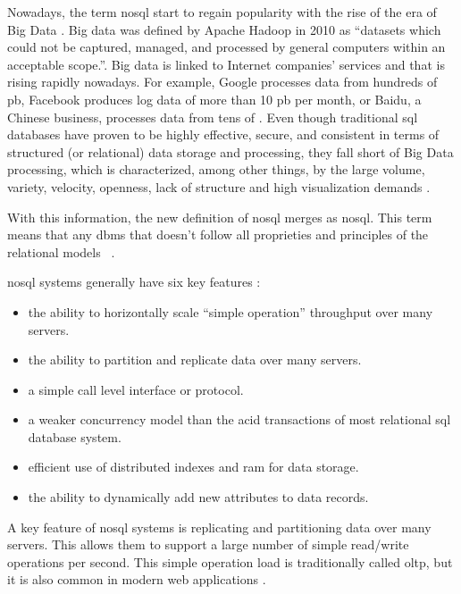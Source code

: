 Nowadays, the term \gls{nosql} start to regain popularity with the rise of the era of Big Data \cite{nosqlchoose}. Big data was defined by Apache Hadoop in 2010 as “datasets which could not be captured, managed, and processed by general computers within an acceptable scope.”. Big data is linked to Internet companies' services and that is rising rapidly nowadays. For example, Google processes data from hundreds of \gls{pb}, Facebook produces log data of more than 10 \gls{pb} per month, or Baidu, a Chinese business, processes data from tens of  \cite{chen2014big}. Even though traditional \gls{sql} databases have proven to be highly effective, secure, and consistent in terms of structured (or relational) data storage and processing, they fall short of Big Data processing, which is characterized, among other things, by the large volume, variety, velocity, openness, lack of structure and high visualization demands \cite{nosqlchoose,https://doi.org/10.1002/cpe.3398}.

With this information, the new definition of \gls{nosql} merges as \acrlong{nosql}. This term means that any \gls{dbms} that doesn't follow all proprieties and principles of the relational models ~\cite{wuoverview,nosqlchoose,breiefreview}. ~

\gls{nosql} systems generally have six key features \cite{cattell2011scalable}:
\begin{itemize}
    \item the ability to horizontally scale “simple operation” throughput over many servers. 
    \item the ability to partition and replicate data over many servers.
    \item a simple call level interface or protocol.
    \item a weaker concurrency model than the \gls{acid} transactions of most relational \gls{sql} database system.
    \item efficient use of distributed indexes and \gls{ram} for
data storage.
    \item the ability to dynamically add new attributes to data records.
\end{itemize}

A key feature of \gls{nosql} systems is replicating and partitioning data
over many servers. This allows them to support a large number of simple read/write operations per second. This simple operation load is traditionally called \gls{oltp}, but it is also common in modern web applications \cite{cattell2011scalable}.

